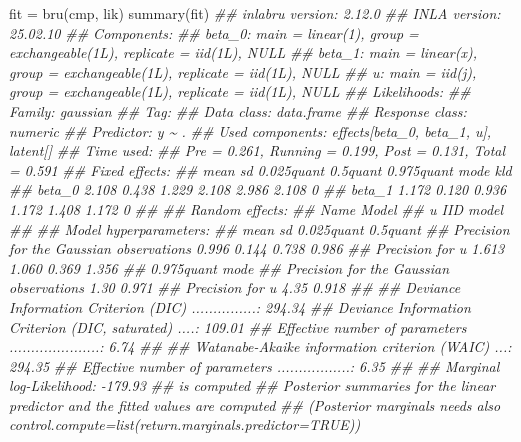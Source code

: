 \documentclass[
  letterpaper,
  DIV=11,
  numbers=noendperiod]{scrartcl}
\newenvironment{Shaded}{\begin{snugshade}}{\end{snugshade}}
\newcommand{\DocumentationTok}[1]{\textcolor[rgb]{0.37,0.37,0.37}{\textit{#1}}}
\newcommand{\FunctionTok}[1]{\textcolor[rgb]{0.28,0.35,0.67}{#1}}
\newcommand{\NormalTok}[1]{\textcolor[rgb]{0.00,0.23,0.31}{#1}}
\newcommand{\OtherTok}[1]{\textcolor[rgb]{0.00,0.23,0.31}{#1}}
\begin{document}
\begin{Shaded}
\begin{Highlighting}[]
\NormalTok{fit }\OtherTok{=} \FunctionTok{bru}\NormalTok{(cmp, lik)}
\FunctionTok{summary}\NormalTok{(fit)}
\DocumentationTok{\#\# inlabru version: 2.12.0}
\DocumentationTok{\#\# INLA version: 25.02.10}
\DocumentationTok{\#\# Components:}
\DocumentationTok{\#\# beta\_0: main = linear(1), group = exchangeable(1L), replicate = iid(1L), NULL}
\DocumentationTok{\#\# beta\_1: main = linear(x), group = exchangeable(1L), replicate = iid(1L), NULL}
\DocumentationTok{\#\# u: main = iid(j), group = exchangeable(1L), replicate = iid(1L), NULL}
\DocumentationTok{\#\# Likelihoods:}
\DocumentationTok{\#\#   Family: \textquotesingle{}gaussian\textquotesingle{}}
\DocumentationTok{\#\#     Tag: \textquotesingle{}\textquotesingle{}}
\DocumentationTok{\#\#     Data class: \textquotesingle{}data.frame\textquotesingle{}}
\DocumentationTok{\#\#     Response class: \textquotesingle{}numeric\textquotesingle{}}
\DocumentationTok{\#\#     Predictor: y \textasciitilde{} .}
\DocumentationTok{\#\#     Used components: effects[beta\_0, beta\_1, u], latent[]}
\DocumentationTok{\#\# Time used:}
\DocumentationTok{\#\#     Pre = 0.261, Running = 0.199, Post = 0.131, Total = 0.591 }
\DocumentationTok{\#\# Fixed effects:}
\DocumentationTok{\#\#         mean    sd 0.025quant 0.5quant 0.975quant  mode kld}
\DocumentationTok{\#\# beta\_0 2.108 0.438      1.229    2.108      2.986 2.108   0}
\DocumentationTok{\#\# beta\_1 1.172 0.120      0.936    1.172      1.408 1.172   0}
\DocumentationTok{\#\# }
\DocumentationTok{\#\# Random effects:}
\DocumentationTok{\#\#   Name     Model}
\DocumentationTok{\#\#     u IID model}
\DocumentationTok{\#\# }
\DocumentationTok{\#\# Model hyperparameters:}
\DocumentationTok{\#\#                                          mean    sd 0.025quant 0.5quant}
\DocumentationTok{\#\# Precision for the Gaussian observations 0.996 0.144      0.738    0.986}
\DocumentationTok{\#\# Precision for u                         1.613 1.060      0.369    1.356}
\DocumentationTok{\#\#                                         0.975quant  mode}
\DocumentationTok{\#\# Precision for the Gaussian observations       1.30 0.971}
\DocumentationTok{\#\# Precision for u                               4.35 0.918}
\DocumentationTok{\#\# }
\DocumentationTok{\#\# Deviance Information Criterion (DIC) ...............: 294.34}
\DocumentationTok{\#\# Deviance Information Criterion (DIC, saturated) ....: 109.01}
\DocumentationTok{\#\# Effective number of parameters .....................: 6.74}
\DocumentationTok{\#\# }
\DocumentationTok{\#\# Watanabe{-}Akaike information criterion (WAIC) ...: 294.35}
\DocumentationTok{\#\# Effective number of parameters .................: 6.35}
\DocumentationTok{\#\# }
\DocumentationTok{\#\# Marginal log{-}Likelihood:  {-}179.93 }
\DocumentationTok{\#\#  is computed }
\DocumentationTok{\#\# Posterior summaries for the linear predictor and the fitted values are computed}
\DocumentationTok{\#\# (Posterior marginals needs also \textquotesingle{}control.compute=list(return.marginals.predictor=TRUE)\textquotesingle{})}
\end{Highlighting}
\end{Shaded}
\end{document}
